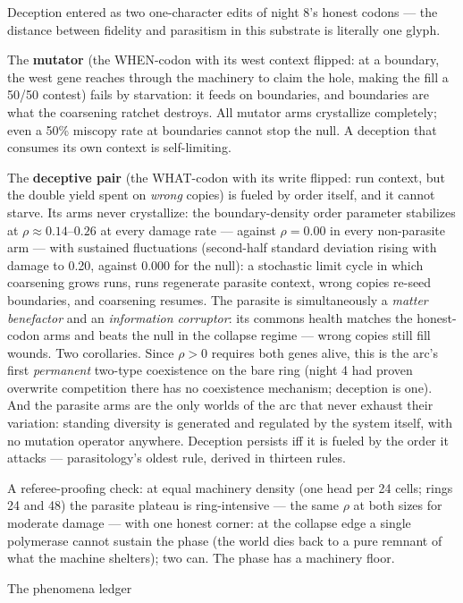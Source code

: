 Deception entered as two one-character edits of night 8's honest
codons --- the distance between fidelity and parasitism in this
substrate is literally one glyph.

The {\bf mutator} (the WHEN-codon with its west context flipped:
at a boundary, the west gene reaches through the machinery to claim
the hole, making the fill a 50/50 contest) fails by starvation: it
feeds on boundaries, and boundaries are what the coarsening ratchet
destroys. All mutator arms crystallize completely; even a 50\%
miscopy rate at boundaries cannot stop the null. A deception that
consumes its own context is self-limiting.

The {\bf deceptive pair} (the WHAT-codon with its write flipped:
run context, but the double yield spent on {\it wrong} copies) is
fueled by order itself, and it cannot starve. Its arms never
crystallize: the boundary-density order parameter stabilizes at
$\rho\approx 0.14$--$0.26$ at every damage rate --- against
$\rho=0.00$ in every non-parasite arm --- with sustained
fluctuations (second-half standard deviation rising with damage to
0.20, against 0.000 for the null): a stochastic limit cycle in
which coarsening grows runs, runs regenerate parasite context,
wrong copies re-seed boundaries, and coarsening resumes. The
parasite is simultaneously a {\it matter benefactor} and an {\it
information corruptor}: its commons health matches the honest-codon
arms and beats the null in the collapse regime --- wrong copies
still fill wounds. Two corollaries. Since $\rho>0$ requires both
genes alive, this is the arc's first {\it permanent} two-type
coexistence on the bare ring (night 4 had proven overwrite
competition there has no coexistence mechanism; deception is one).
And the parasite arms are the only worlds of the arc that never
exhaust their variation: standing diversity is generated and
regulated by the system itself, with no mutation operator anywhere.
 Deception persists iff it is fueled by the order it
attacks --- parasitology's oldest rule, derived in thirteen rules.

A referee-proofing check: at equal machinery density (one head per
24 cells; rings 24 and 48) the parasite plateau is ring-intensive
--- the same $\rho$ at both sizes for moderate damage --- with one
honest corner: at the collapse edge a single polymerase cannot
sustain the phase (the world dies back to a pure remnant of what
the machine shelters); two can. The phase has a machinery floor.

\sec The phenomena ledger


